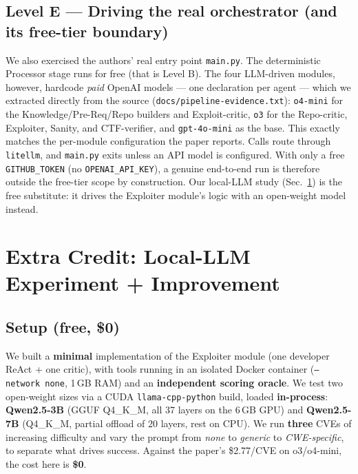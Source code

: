 \documentclass[conference,10pt,a4paper]{IEEEtran}
\newcommand{\code}[1]{\texttt{\small #1}}
\begin{document}
\subsection{Level E --- Driving the real orchestrator (and its free-tier boundary)}
We also exercised the authors' real entry point \code{main.py}. The deterministic Processor stage runs for free (that is Level B). The four LLM-driven modules, however, hardcode \textit{paid} OpenAI models --- one declaration per agent --- which we extracted directly from the source (\code{docs/pipeline-evidence.txt}): \code{o4-mini} for the Knowledge/Pre-Req/Repo builders and Exploit-critic, \code{o3} for the Repo-critic, Exploiter, Sanity, and CTF-verifier, and \code{gpt-4o-mini} as the base. This exactly matches the per-module configuration the paper reports. Calls route through \code{litellm}, and \code{main.py} exits unless an API model is configured. With only a free \code{GITHUB\_TOKEN} (no \code{OPENAI\_API\_KEY}), a genuine end-to-end run is therefore outside the free-tier scope by construction. Our local-LLM study (Sec.~\ref{sec:bonus}) is the free substitute: it drives the Exploiter module's logic with an open-weight model instead.

\section{Extra Credit: Local-LLM Experiment + Improvement}\label{sec:bonus}

\subsection{Setup (free, \$0)}
We built a \textbf{minimal} implementation of the Exploiter module (one developer ReAct + one critic), with tools running in an isolated Docker container (\code{--network none}, 1\,GB RAM) and an \textbf{independent scoring oracle}. We test two open-weight sizes via a CUDA \code{llama-cpp-python} build, loaded \textbf{in-process}: \textbf{Qwen2.5-3B} (GGUF Q4\_K\_M, all 37 layers on the 6\,GB GPU) and \textbf{Qwen2.5-7B} (Q4\_K\_M, partial offload of 20 layers, rest on CPU). We run \textbf{three} CVEs of increasing difficulty and vary the prompt from \textit{none} to \textit{generic} to \textit{CWE-specific}, to separate what drives success. Against the paper's \$2.77/CVE on o3/o4-mini, the cost here is \textbf{\$0}.
\end{document}
